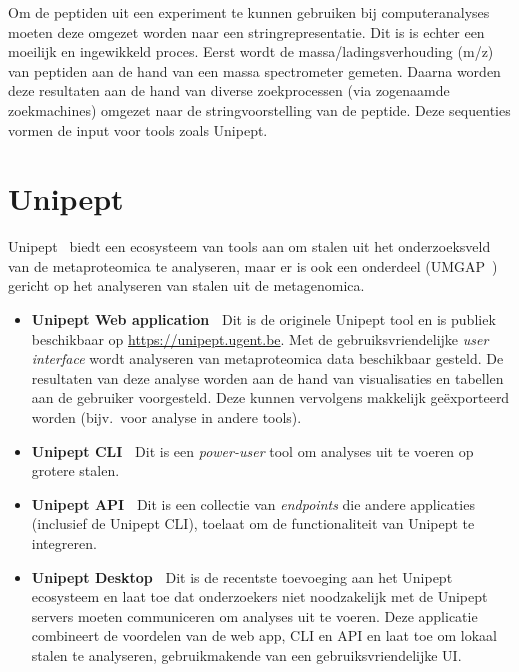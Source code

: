 Om de peptiden uit een experiment te kunnen gebruiken bij computeranalyses moeten deze omgezet worden naar een stringrepresentatie.
Dit is is echter een moeilijk en ingewikkeld proces.
Eerst wordt de massa/ladingsverhouding (m/z) van peptiden aan de hand van een massa spectrometer gemeten.
Daarna worden deze resultaten aan de hand van diverse zoekprocessen (via zogenaamde zoekmachines) omgezet naar de stringvoorstelling van de peptide.
Deze sequenties vormen de input voor tools zoals Unipept.


\section{Unipept}\label{sec:unipept-introductie}
Unipept~\cite{unipept_orig} biedt een ecosysteem van tools aan om stalen uit het onderzoeksveld van de metaproteomica te analyseren, maar er is ook een onderdeel (UMGAP~\cite{UMGAP_paper}) gericht op het analyseren van stalen uit de metagenomica.

\begin{itemize}
    \item \textbf{Unipept Web application~\cite{unipept_orig, unipept_web, unipept_tutorial, unipept_4}} Dit is de originele Unipept tool en is publiek beschikbaar op \url{https://unipept.ugent.be}.
    Met de gebruiksvriendelijke \textit{user interface} wordt analyseren van metaproteomica data beschikbaar gesteld.
    De resultaten van deze analyse worden aan de hand van visualisaties en tabellen aan de gebruiker voorgesteld.
    Deze kunnen vervolgens makkelijk geëxporteerd worden (bijv.~voor analyse in andere tools).
    \item \textbf{Unipept CLI~\cite{unipept_cli}} Dit is een \textit{power-user} tool om analyses uit te voeren op grotere stalen.
    \item \textbf{Unipept API~\cite{unipept_api, unipept_cli}} Dit is een collectie van \textit{endpoints} die andere applicaties (inclusief de Unipept CLI), toelaat om de functionaliteit van Unipept te integreren.
    \item \textbf{Unipept Desktop~\cite{unipept_desktop, unipept_desktop_2}} Dit is de recentste toevoeging aan het Unipept ecosysteem en laat toe dat onderzoekers niet noodzakelijk met de Unipept servers moeten communiceren om analyses uit te voeren.
    Deze applicatie combineert de voordelen van de web app, CLI en API en laat toe om lokaal stalen te analyseren, gebruikmakende van een gebruiksvriendelijke UI\@.

\end{itemize}

